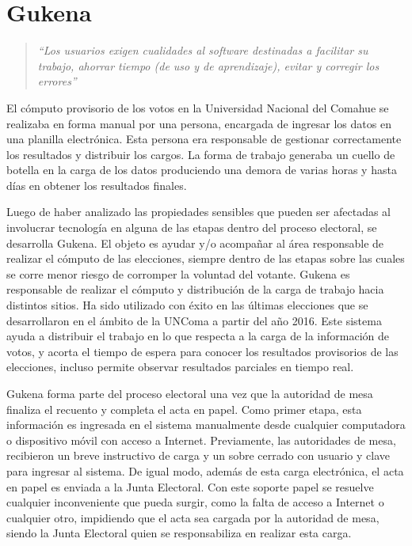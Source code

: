 \chapter{Gukena}
\label{Gukena}
\cambiar{}

\begin{quote}\textit{``Los usuarios exigen cualidades al software destinadas a facilitar su trabajo, ahorrar tiempo (de uso y de aprendizaje), evitar y corregir los errores''} \cite{definicionUsuarioInterfaz}\end{quote} 
El cómputo provisorio de los votos en la Universidad Nacional del Comahue se realizaba en forma manual por una persona, encargada de ingresar los datos en una planilla electrónica. Esta persona era responsable de gestionar correctamente los resultados y distribuir los cargos. La forma de trabajo generaba un cuello de botella en la carga de los datos produciendo una demora de varias horas y hasta días en obtener los resultados finales.

Luego de haber analizado las propiedades sensibles que pueden ser afectadas al involucrar tecnología en alguna de las etapas dentro del proceso electoral, se desarrolla Gukena. El objeto es ayudar y/o 
acompañar al área responsable de realizar el cómputo de las elecciones, siempre dentro de las etapas sobre las cuales se corre menor riesgo de corromper la voluntad del votante. Gukena es responsable de realizar el cómputo y distribución de la carga de trabajo hacia distintos sitios. Ha sido utilizado con éxito en las últimas elecciones que se desarrollaron en el ámbito de la UNComa a partir del año 2016. Este sistema ayuda a distribuir el trabajo en lo que respecta a la carga de la información de votos, y acorta el tiempo de espera para conocer los resultados provisorios de las elecciones, incluso permite observar resultados parciales en tiempo real.\newline

Gukena forma parte del proceso electoral una vez que la autoridad de mesa finaliza el recuento y completa el acta en papel. Como primer etapa, esta información es ingresada en el sistema manualmente desde cualquier computadora o dispositivo móvil con acceso a Internet. Previamente, las autoridades de mesa, recibieron un breve instructivo de carga y un sobre cerrado con usuario y clave para ingresar al sistema. De igual modo, además de esta carga electrónica, el acta en papel es enviada a la Junta Electoral. Con este soporte papel se resuelve cualquier inconveniente que pueda surgir, como la falta de acceso a Internet o cualquier otro,  impidiendo que el acta sea cargada por la autoridad de mesa, siendo la Junta Electoral quien se responsabiliza en realizar esta carga.

